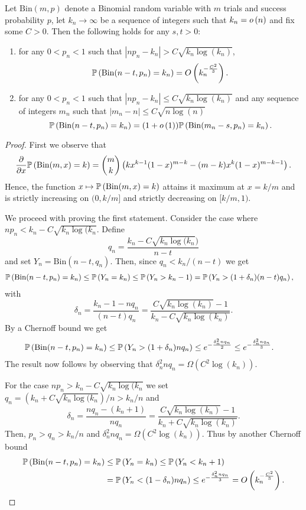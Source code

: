 \begin{appendices}
\begin{lemma}\label{lem:concentration_height_binomial}
Let $\mathrm{Bin}(m,p)$ denote a Binomial random variable with $m$ trials and success probability $p$, let $k_n \to \infty$ be a sequence of integers such that $k_n = o\left(n\right)$ and fix some $C > 0$. Then the following holds for any $s, t > 0$:
\begin{enumerate}
\item for any $0 < p_n < 1$ such that $|n p_n - k_n| > C \sqrt{k_n \log(k_n)}$,
\[
	\mathbb{P}\left(\mathrm{Bin}(n-t,p_n) = k_n\right) = O\left(k_n^{-\frac{C^2}{3}}\right).
\]
\item for any $0 < p_n < 1$ such that $|n p_n - k_n| \le  C \sqrt{k_n \log(k_n)}$ and any sequence of integers $m_n$ such that $|m_n -n|\le C \sqrt{n \log(n)}$
\[
	\mathbb{P}\left(\mathrm{Bin}(n-t,p_n) = k_n\right) = (1+o\left(1\right))\mathbb{P}\left(\mathrm{Bin}(m_n-s,p_n) = k_n\right).
\]
\end{enumerate}
\end{lemma}

\begin{proof}
First we observe that
\[
	\frac{\partial}{\partial x} \mathbb{P}\left(\mathrm{Bin}(m,x) = k\right) = \binom{m}{k}\left(k x^{k-1}(1-x)^{m-k}
	- (m-k)x^k (1-x)^{m-k-1}\right).
\]
Hence, the function $x \mapsto \mathbb{P}\left(\mathrm{Bin}(m,x) = k\right)$ attains it maximum at $x = k/m$ and is strictly increasing on $(0,k/m]$ and strictly decreasing on $[k/m,1)$.

We proceed with proving the first statement. Consider the case where $n p_n < k_n - C \sqrt{k_n \log(k_n}$. Define 
\[
	q_n = \frac{k_n - C \sqrt{k_n \log(k_n})}{n-t}
\]
and set $Y_n = \mathrm{Bin}(n-t,q_n)$. Then, since $q_n < k_n/(n-t)$ we get
\begin{align*}
	\mathbb{P}\left(\mathrm{Bin}(n-t,p_n) = k_n\right) &\le \mathbb{P}\left(Y_n = k_n\right) \le \mathbb{P}\left(Y_n > k_n-1\right)
		= \mathbb{P}\left(Y_n > (1+\delta_n)(n-t)q_n\right),
\end{align*}
with
\[
	\delta_n = \frac{k_n - 1 -nq_n}{(n -t)q_n}
	= \frac{C \sqrt{k_n \log(k_n)} - 1}{k_n - C \sqrt{k_n \log(k_n)}}.
\]
By a Chernoff bound we get
\begin{align*}
	\mathbb{P}\left(\mathrm{Bin}(n-t,p_n) = k_n\right) &\le \mathbb{P}\left(Y_n > (1+\delta_n)nq_n\right)
		\le e^{-\frac{\delta_n^2 n q_n}{2}} \le e^{-\frac{\delta_n^2 n q_n}{3}}.
\end{align*}
The result now follows by observing that $\delta_n^2 n q_n = \Omega\left(C^2 \log(k_n)\right)$.

For the case $n p_n > k_n - C \sqrt{k_n \log(k_n}$ we set $q_n = (k_n + C \sqrt{k_n \log(k_n})/n > k_n/n$ and 
\[
	\delta_n = \frac{nq_n - (k_n +1)}{n q_n}
	= \frac{C \sqrt{k_n \log(k_n)} - 1}{k_n + C \sqrt{k_n \log(k_n)}}.
\]
Then, $p_n > q_n > k_n/n$ and $\delta_n^2 n q_n = \Omega\left(C^2 \log(k_n)\right)$. Thus by another Chernoff bound
\begin{align*}
	\mathbb{P}\left(\mathrm{Bin}(n-t,p_n) = k_n\right) &\le \mathbb{P}\left(Y_n = k_n\right) \le \mathbb{P}\left(Y_n < k_n+1\right)\\
	&= \mathbb{P}\left(Y_n < (1-\delta_n)nq_n\right)
		\le e^{-\frac{\delta_n^2 n q_n}{3}} = O\left(k_n^{-\frac{C^2}{3}}\right).
\end{align*}


\end{proof}
\end{appendices}
